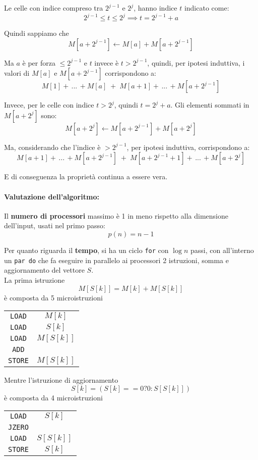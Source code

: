 \begin{enumerate}
\begin{itemize}
		Le celle con indice compreso tra $2^{j-1}$ e $2^j$, hanno indice $t$ indicato come:
		$$ 2^{j-1} \leq t \leq 2^j \implies t = 2^{j-1} + a$$
		
		Quindi sappiamo che 
		$$ M[a + 2^{j-1}] \leftarrow M [a] + M[a + 2^{j-1}]$$
		
		Ma $a$ è per forza $\leq 2^{j-1}$ e $t$ invece è $t > 2^{j-1}$, quindi, per ipotesi induttiva, i valori di $M [a]$ e $M[a + 2^{j-1}]$ corrispondono a:
		$$ M[1] + \, ...\, + M[a] \; + \; M[a+1] + \, ... \, + M[a+2^{j-1}] $$
		
		Invece, per le celle con indice $t > 2^j$, quindi $t = 2^j + a$. Gli elementi sommati in $M[a + 2^j]$ sono: 
		$$ M[a + 2^j] \leftarrow M[a + 2^{j-1}] + M[a + 2^j] $$
		
		Ma, considerando che l'indice è $> 2^{j-1}$, per ipotesi induttiva, corrispondono a:
		$$ M[a + 1] + \, ... \, + M[a + 2^{j-1}] \; + \; M[a + 2^{j-1} + 1] + \, ... \, + M[a + 2^j] $$
		
		E di conseguenza la proprietà continua a essere vera.
	\end{itemize}
\end{enumerate}


\newpage

\paragraph{Valutazione dell'algoritmo:} Il \textbf{numero di processori} massimo è 1 in meno rispetto alla dimensione dell'input, usati nel primo passo:
$$ p(n) = n-1 $$

Per quanto riguarda il \textbf{tempo}, si ha un ciclo \texttt{for} con $\log n$ passi, con all'interno un \texttt{par do} che fa eseguire in parallelo ai processori 2 istruzioni, somma e aggiornamento del vettore $S$.\\
La prima istruzione
$$ M[S[k]] = M[k] + M[S[k]] $$
è composta da 5 microistruzioni
\begin{center}
	\begin{tabular}{c c}
		\texttt{LOAD} & $M[k]$ \\
		\texttt{LOAD} & $S[k]$ \\
		\texttt{LOAD} & $M[S[k]]$ \\
		\texttt{ADD} & \\
		\texttt{STORE} & $M[S[k]]$ \\
	\end{tabular}
\end{center}
Mentre l'istruzione di aggiornamento
$$ S[k] = (S[k]==0 ? 0 : S[S[k]]) $$
è composta da 4 microistruzioni
\begin{center}
	\begin{tabular}{c c}
		\texttt{LOAD} & $S[k]$ \\
		\texttt{JZERO} & \\
		\texttt{LOAD} & $S[S[k]]$ \\
		\texttt{STORE} & $S[k]$
	\end{tabular}
\end{center}


